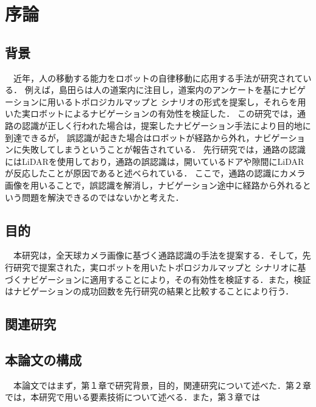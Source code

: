 \documentclass[../main]{subfiles}
\begin{document}
    \setcounter{secnumdepth}{2}
    \chapter{序論}
        \section{背景}
        　近年，人の移動する能力をロボットの自律移動に応用する手法が研究されている．
        例えば，島田らは人の道案内に注目し，道案内のアンケートを基にナビゲーションに用いるトポロジカルマップと
        シナリオの形式を提案し，それらを用いた実ロボットによるナビゲーションの有効性を検証した．
        この研究では，通路の認識が正しく行われた場合は，提案したナビゲーション手法により目的地に到達できるが，
        誤認識が起きた場合はロボットが経路から外れ，ナビゲーションに失敗してしまうということが報告されている．
        先行研究では，通路の認識にはLiDARを使用しており，通路の誤認識は，開いているドアや隙間にLiDARが反応したことが原因であると述べられている．
        ここで，通路の認識にカメラ画像を用いることで，誤認識を解消し，ナビゲーション途中に経路から外れるという問題を解決できるのではないかと考えた．
        \section{目的}
        　本研究は，全天球カメラ画像に基づく通路認識の手法を提案する．そして，先行研究で提案された，実ロボットを用いたトポロジカルマップと
        シナリオに基づくナビゲーションに適用することにより，その有効性を検証する．また，検証はナビゲーションの成功回数を先行研究の結果と比較することにより行う．
        \section{関連研究}
        \section{本論文の構成}
        　本論文ではまず，第１章で研究背景，目的，関連研究について述べた．第２章では，本研究で用いる要素技術について述べる．また，第３章では
\end{document}

